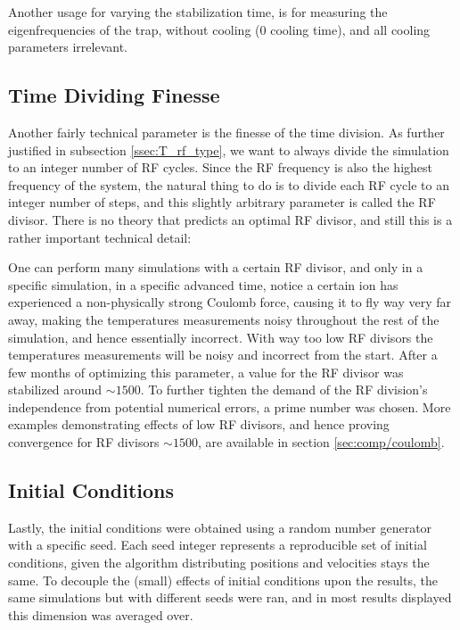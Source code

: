 \label{TODO1}

Another usage for varying the stabilization time, is for measuring the eigenfrequencies of the trap, without cooling ($0$ cooling time), and all cooling parameters irrelevant.

\subsection{Time Dividing Finesse}

Another fairly technical parameter is the finesse of the time division. As further justified in subsection \ref{ssec:T_rf_type}, we want to always divide the simulation to an integer number of RF cycles. Since the RF frequency is also the highest frequency of the system, the natural thing to do is to divide each RF cycle to an integer number of steps, and this slightly arbitrary parameter is called the RF divisor. There is no theory that predicts an optimal RF divisor, and still this is a rather important technical detail:

One can perform many simulations with a certain RF divisor, and only in a specific simulation, in a specific advanced time, notice a certain ion has experienced a non-physically strong Coulomb force, causing it to fly way very far away, making the temperatures measurements noisy throughout the rest of the simulation, and hence essentially incorrect. With way too low RF divisors the temperatures measurements will be noisy and incorrect from the start. After a few months of optimizing this parameter, a value for the RF divisor was stabilized around $\sim 1500$. To further tighten the demand of the RF division's independence from potential numerical errors, a prime number was chosen.\cite{primesieve} More examples demonstrating effects of low RF divisors, and hence proving convergence for RF divisors $\sim 1500$, are available in section \ref{sec:comp/coulomb}.

\subsection{Initial Conditions}

Lastly, the initial conditions were obtained using a random number generator with a specific seed. Each seed integer represents a reproducible set of initial conditions, given the algorithm distributing positions and velocities stays the same. To decouple the (small) effects of initial conditions upon the results, the same simulations but with different seeds were ran, and in most results displayed this dimension was averaged over.

